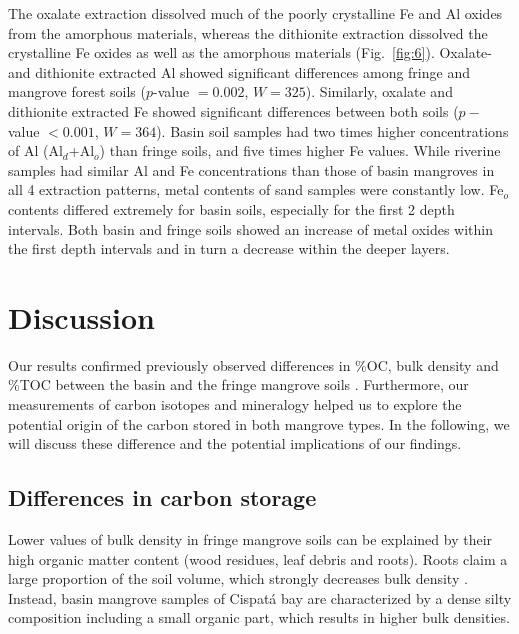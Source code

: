 The oxalate extraction dissolved much of the poorly crystalline Fe and Al oxides from the amorphous materials, whereas the dithionite extraction dissolved the crystalline Fe oxides as well as the amorphous materials \mbox{(Fig. \ref{fig:6})}. Oxalate- and dithionite extracted Al showed significant differences among fringe and mangrove forest soils ($p$-value $= 0.002$, $W = 325$). Similarly, oxalate and dithionite extracted Fe showed significant differences between both soils ($p-$value $< 0.001$, $W = 364$).
Basin soil samples had two times higher concentrations of Al (Al$_d$+Al$_o$) than fringe soils, and five times higher Fe values. While riverine samples had similar Al and Fe concentrations than those of basin mangroves in all 4 extraction patterns, metal contents of sand samples were constantly low. Fe$_o$ contents differed extremely for basin soils, especially for the first 2 depth intervals. Both basin and fringe soils showed an increase of metal oxides within the first depth intervals and in turn a decrease within the deeper layers.

\section{Discussion}
Our results confirmed previously observed differences in \%OC, bulk density and \%TOC between the basin and the fringe mangrove soils \citep{Bolivar2015}.  Furthermore, our measurements of carbon isotopes and mineralogy helped us to explore the potential origin of the carbon stored in both mangrove types. In the following, we will discuss these difference and the potential implications of our findings. 

\subsection{Differences in carbon storage}
Lower values of bulk density in fringe mangrove soils can be explained by their high organic matter content (wood residues, leaf debris and roots). Roots claim a large proportion of the soil volume, which strongly decreases bulk density \citep{Bolivar2015}. Instead, basin mangrove samples of Cispat\'{a} bay are characterized by a dense silty composition including a small organic part, which results in higher bulk densities. %

